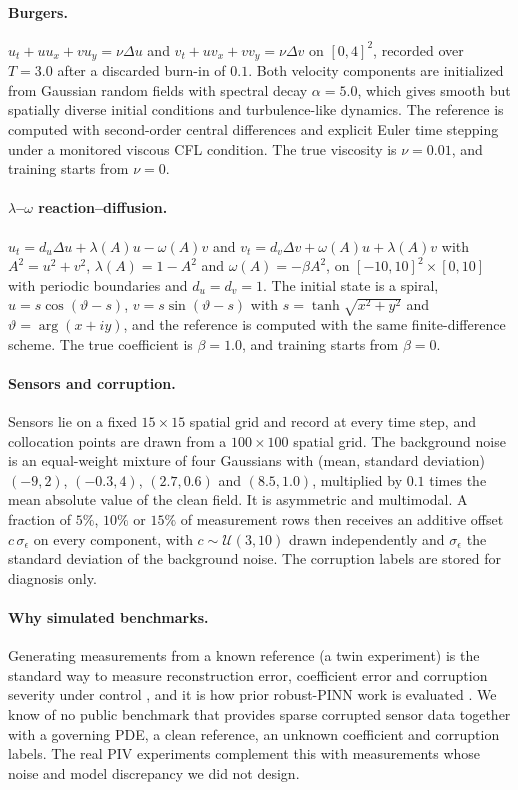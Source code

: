 \documentclass[twoside]{article}
\begin{document}
\paragraph{Burgers.}
$u_t + u u_x + v u_y = \nu \Delta u$ and $v_t + u v_x + v v_y = \nu \Delta v$ on
$[0,4]^2$, recorded over $T = 3.0$ after a discarded burn-in of $0.1$. Both
velocity components are initialized from Gaussian random fields with spectral
decay $\alpha = 5.0$, which gives smooth but spatially diverse initial
conditions and turbulence-like dynamics. The reference is computed with
second-order central differences and explicit Euler time stepping under a monitored
viscous CFL condition. The true viscosity is $\nu = 0.01$, and training starts from
$\nu = 0$.

\paragraph{$\lambda$--$\omega$ reaction--diffusion.}
$u_t = d_u \Delta u + \lambda(A)u - \omega(A)v$ and
$v_t = d_v \Delta v + \omega(A)u + \lambda(A)v$ with $A^2 = u^2 + v^2$,
$\lambda(A) = 1 - A^2$ and $\omega(A) = -\beta A^2$, on
$[-10,10]^2 \times [0,10]$ with periodic boundaries and $d_u = d_v = 1$. The
initial state is a spiral,
$u = s\cos(\vartheta - s)$, $v = s\sin(\vartheta - s)$ with
$s = \tanh\sqrt{x^2+y^2}$ and $\vartheta = \arg(x + iy)$, and the reference is
computed with the same finite-difference scheme. The true coefficient is
$\beta = 1.0$, and training starts from $\beta = 0$.

\paragraph{Sensors and corruption.}
Sensors lie on a fixed $15 \times 15$ spatial grid and record at every time
step, and collocation points are drawn from a $100 \times 100$ spatial grid. The
background noise is an equal-weight mixture of four Gaussians with (mean,
standard deviation) $(-9, 2)$, $(-0.3, 4)$, $(2.7, 0.6)$ and $(8.5, 1.0)$,
multiplied by $0.1$ times the mean absolute value of the clean field. It is
asymmetric and multimodal. A fraction of $5\%$, $10\%$ or $15\%$ of measurement
rows then receives an additive offset $c\,\sigma_\epsilon$ on every component,
with $c \sim \mathcal{U}(3,10)$ drawn independently and $\sigma_\epsilon$ the
standard deviation of the background noise. The corruption labels are stored
for diagnosis only.

\paragraph{Why simulated benchmarks.}
Generating measurements from a known reference (a twin experiment) is the
standard way to measure reconstruction error, coefficient error and corruption
severity under control \citep{Asch2016}, and it is how prior robust-PINN work
is evaluated \citep{Yang2021, Peng2022, Duarte2025}. We know of no public
benchmark that provides sparse corrupted sensor data together with a governing
PDE, a clean reference, an unknown coefficient and corruption labels. The real
PIV experiments complement this with measurements whose noise and model
discrepancy we did not design.
\end{document}
